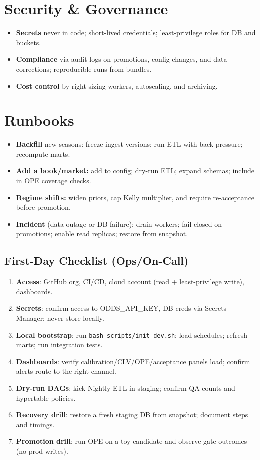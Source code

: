 \section{Security \& Governance}
\begin{itemize}
  \item \textbf{Secrets} never in code; short-lived credentials; least-privilege roles for DB and buckets.
  \item \textbf{Compliance} via audit logs on promotions, config changes, and data corrections; reproducible runs from bundles.
  \item \textbf{Cost control} by right-sizing workers, autoscaling, and archiving.
\end{itemize}

\section{Runbooks}
\begin{itemize}
  \item \textbf{Backfill} new seasons: freeze ingest versions; run ETL with back-pressure; recompute marts.
  \item \textbf{Add a book/market:} add to config; dry-run ETL; expand schemas; include in OPE coverage checks.
  \item \textbf{Regime shifts:} widen priors, cap Kelly multiplier, and require re-acceptance before promotion.
  \item \textbf{Incident} (data outage or DB failure): drain workers; fail closed on promotions; enable read replicas; restore from snapshot.
\end{itemize}

\subsection*{First-Day Checklist (Ops/On-Call)}
\begin{enumerate}
  \item \textbf{Access}: GitHub org, CI/CD, cloud account (read + least-privilege write), dashboards.
  \item \textbf{Secrets}: confirm access to ODDS\_API\_KEY, DB creds via Secrets Manager; never store locally.
  \item \textbf{Local bootstrap}: run \texttt{bash scripts/init\_dev.sh}; load schedules; refresh marts; run integration tests.
  \item \textbf{Dashboards}: verify calibration/CLV/OPE/acceptance panels load; confirm alerts route to the right channel.
  \item \textbf{Dry-run DAGs}: kick Nightly ETL in staging; confirm QA counts and hypertable policies.
  \item \textbf{Recovery drill}: restore a fresh staging DB from snapshot; document steps and timings.
  \item \textbf{Promotion drill}: run OPE on a toy candidate and observe gate outcomes (no prod writes).
\end{enumerate}

